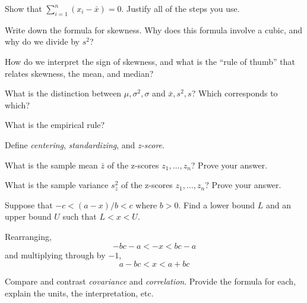 \documentclass[addpoints,12pt]{exam}
\begin{document}
\begin{questions}

  \question Show that $\sum_{i=1}^n (x_i - \bar{x}) = 0$. Justify all of the steps you use.

\question Write down the formula for skewness. Why does this formula involve a cubic, and why do we divide by $s^2$? 

\question How do we interpret the sign of skewness, and what is the ``rule of thumb'' that relates skewness, the mean, and median?

\question What is the distinction between $\mu, \sigma^2, \sigma$ and $\bar{x}, s^2, s$? Which corresponds to which?

\question What is the empirical rule?

\question Define \emph{centering}, \emph{standardizing}, and \emph{z-score}.

\question What is the sample mean $\bar{z}$ of the z-scores $z_1, \dots, z_n$? Prove your answer.

\question What is the sample variance $s_z^2$ of the z-scores $z_1, \dots, z_n$? Prove your answer.

\question Suppose that $-c < (a - x)/b < c$ where $b>0$. Find a lower bound $L$ and an upper bound $U$ such that $L < x < U$.
			\begin{solution}
				Rearranging, 
					$$-bc - a < -x < bc - a$$
				and multiplying through by $-1$,
					$$a - bc < x <a + bc$$
        \end{solution}

\question Compare and contrast \emph{covariance} and \emph{correlation}. Provide the formula for each, explain the units, the interpretation, etc.


\end{questions}
\end{document}
